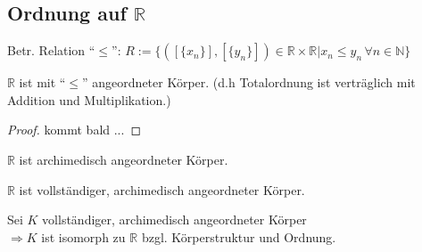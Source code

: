 \subsection{Ordnung auf \texorpdfstring{$\mathbb{R}$}{R}}
\begin{*definition}
	Betr. Relation "`$\le$"': $R:=\{ ([\{x_n\}],[\{y_n\}])\in\mathbb{R}\times\mathbb{R} | x_n \le y_n\,\forall n\in\mathbb{N}\}$
\end{*definition}
\begin{proposition}
	$\mathbb{R}$ ist mit "`$\le$"' angeordneter Körper. (d.h Totalordnung ist verträglich mit Addition und Multiplikation.)
\end{proposition}

\begin{proof}
	kommt bald ...
\end{proof}

\begin{proposition}
	$\mathbb{R}$ ist archimedisch angeordneter Körper.
\end{proposition}
\begin{theorem}
	$\mathbb{R}$ ist vollständiger, archimedisch angeordneter Körper.
\end{theorem}
\begin{theorem}
	Sei $K$ vollständiger, archimedisch angeordneter Körper\\
	$\Rightarrow K$ ist isomorph zu $\mathbb{R}$ bzgl. Körperstruktur und Ordnung.
\end{theorem}

